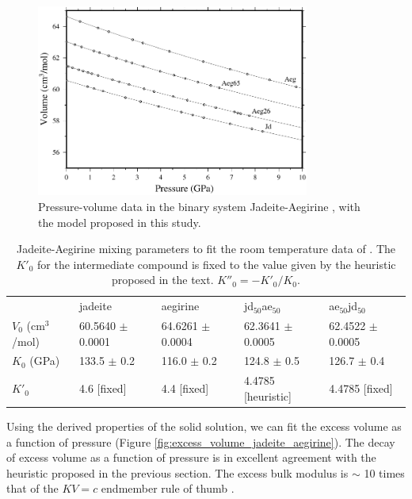 \documentclass[review]{elsarticle}
\begin{document}
\begin{figure}[ht!]
  \centering
  \includegraphics[width=0.8\textwidth]{figures/jadeite_aegirine_P_V}
  \caption{Pressure-volume data in the binary system Jadeite-Aegirine \citep{NBLBT2006}, with the model proposed in this study.}
  \label{fig:PV_jadeite_aegirine}
\end{figure}

\begin{table}[ht!]
\centering
\caption{Jadeite-Aegirine mixing parameters to fit the room temperature data of \cite{NBLBT2006}. The $K'_0$ for the intermediate compound is fixed to the value given by the heuristic proposed in the text. $K''_0 = -K'_0/K_0$.}
\label{tab:jd_aeg}
\begin{tabular}{lllll}
                   & jadeite              & aegirine             & jd$_{50}$ae$_{50}$             & ae$_{50}$jd$_{50}$             \\
$V_0$ (cm$^3$/mol) & 60.5640 $\pm$ 0.0001 & 64.6261 $\pm$ 0.0004 & 62.3641 $\pm$ 0.0005 & 62.4522 $\pm$ 0.0005 \\
$K_0$ (GPa)        & 133.5 $\pm$ 0.2      & 116.0 $\pm$ 0.2      & 124.8 $\pm$ 0.5      & 126.7 $\pm$ 0.4      \\
$K'_0$             & 4.6 [fixed]                 & 4.4 [fixed]                 & 4.4785 [heuristic]              & 4.4785  [fixed]           
\end{tabular}
\end{table}

Using the derived properties of the solid solution, we can fit the excess volume as a function of pressure (Figure \ref{fig:excess_volume_jadeite_aegirine}). The decay of excess volume as a function of pressure is in excellent agreement with the heuristic proposed in the previous section. The excess bulk modulus is $\sim$ 10 times that of the $KV=c$ endmember rule of thumb \citep{AA1970}. 
\end{document}
